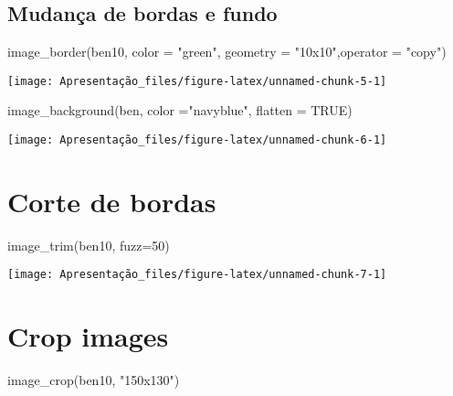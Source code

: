\documentclass[
]{article}
\newenvironment{Shaded}{\begin{snugshade}}{\end{snugshade}}
\newcommand{\AttributeTok}[1]{\textcolor[rgb]{0.77,0.63,0.00}{#1}}
\newcommand{\ConstantTok}[1]{\textcolor[rgb]{0.00,0.00,0.00}{#1}}
\newcommand{\DecValTok}[1]{\textcolor[rgb]{0.00,0.00,0.81}{#1}}
\newcommand{\FunctionTok}[1]{\textcolor[rgb]{0.00,0.00,0.00}{#1}}
\newcommand{\NormalTok}[1]{#1}
\newcommand{\StringTok}[1]{\textcolor[rgb]{0.31,0.60,0.02}{#1}}
\begin{document}
\hypertarget{mudanuxe7a-de-bordas-e-fundo}{%
\subsection{Mudança de bordas e
fundo}\label{mudanuxe7a-de-bordas-e-fundo}}

\begin{Shaded}
\begin{Highlighting}[]
\FunctionTok{image\_border}\NormalTok{(ben10, }\AttributeTok{color =} \StringTok{"green"}\NormalTok{, }
             \AttributeTok{geometry =} \StringTok{"10x10"}\NormalTok{,}\AttributeTok{operator =} \StringTok{"copy"}\NormalTok{)}
\end{Highlighting}
\end{Shaded}

\texttt{[image: Apresentação\_files/figure-latex/unnamed-chunk-5-1]}

\begin{Shaded}
\begin{Highlighting}[]
\FunctionTok{image\_background}\NormalTok{(ben, }\AttributeTok{color =}\StringTok{"navyblue"}\NormalTok{, }\AttributeTok{flatten =} \ConstantTok{TRUE}\NormalTok{)}
\end{Highlighting}
\end{Shaded}

\texttt{[image: Apresentação\_files/figure-latex/unnamed-chunk-6-1]}

\hypertarget{corte-de-bordas}{%
\section{Corte de bordas}\label{corte-de-bordas}}

\begin{Shaded}
\begin{Highlighting}[]
\FunctionTok{image\_trim}\NormalTok{(ben10, }\AttributeTok{fuzz=}\DecValTok{50}\NormalTok{)}
\end{Highlighting}
\end{Shaded}

\texttt{[image: Apresentação\_files/figure-latex/unnamed-chunk-7-1]}

\hypertarget{crop-images}{%
\section{Crop images}\label{crop-images}}

\begin{Shaded}
\begin{Highlighting}[]
\FunctionTok{image\_crop}\NormalTok{(ben10, }\StringTok{"150x130"}\NormalTok{)}
\end{Highlighting}
\end{Shaded}
\end{document}
